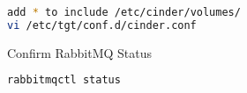 \documentclass[11pt,letterpaper,oneside]{book}
\begin{document}
\begin{lstlisting}[caption={add * to include /etc/cinder/volumes/},language=bash]
add * to include /etc/cinder/volumes/
vi /etc/tgt/conf.d/cinder.conf
\end{lstlisting}


\begin{flushleft}
\begin{huge} \danger \end{huge} Confirm RabbitMQ Status
\end{flushleft}
\begin{lstlisting}[caption={},language=bash]
rabbitmqctl status
\end{lstlisting}
\end{document}
